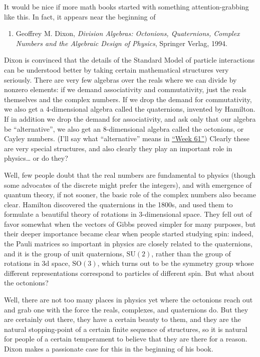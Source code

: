 \documentclass{article}
\def\tightlist{}
\begin{document}
It would be nice if more math books started with something
attention-grabbing like this. In fact, it appears near the beginning of

\begin{enumerate}
\def\labelenumi{\arabic{enumi})}
\tightlist
\item
  Geoffrey M. Dixon, \emph{Division Algebras: Octonions, Quaternions,
  Complex Numbers and the Algebraic Design of Physics}, Springer Verlag,
  1994.
\end{enumerate}

Dixon is convinced that the details of the Standard Model of particle
interactions can be understood better by taking certain mathematical
structures very seriously. There are very few algebras over the reals
where we can divide by nonzero elements: if we demand associativity and
commutativity, just the reals themselves and the complex numbers. If we
drop the demand for commutativity, we also get a 4-dimensional algebra
called the quaternions, invented by Hamilton. If in addition we drop the
demand for associativity, and ask only that our algebra be
``alternative'', we also get an 8-dimensional algebra called the
octonions, or Cayley numbers. (I'll say what ``alternative'' means in
\protect\hyperlink{week61}{``Week 61''}) Clearly these are very special
structures, and also clearly they play an important role in
physics\ldots{} or do they?

Well, few people doubt that the real numbers are fundamental to physics
(though some advocates of the discrete might prefer the integers), and
with emergence of quantum theory, if not sooner, the basic role of the
complex numbers also became clear. Hamilton discovered the quaternions
in the 1800s, and used them to formulate a beautiful theory of rotations
in 3-dimensional space. They fell out of favor somewhat when the vectors
of Gibbs proved simpler for many purposes, but their deeper importance
became clear when people started studying spin: indeed, the Pauli
matrices so important in physics are closely related to the quaternions,
and it is the group of unit quaternions, \(\mathrm{SU}(2)\), rather than
the group of rotations in 3d space, \(\mathrm{SO}(3)\), which turns out
to be the symmetry group whose different representations correspond to
particles of different spin. But what about the octonions?

Well, there are not too many places in physics yet where the octonions
reach out and grab one with the force the reals, complexes, and
quaternions do. But they are certainly out there, they have a certain
beauty to them, and they are the natural stopping-point of a certain
finite sequence of structures, so it is natural for people of a certain
temperament to believe that they are there for a reason. Dixon makes a
passionate case for this in the beginning of his book.
\end{document}
